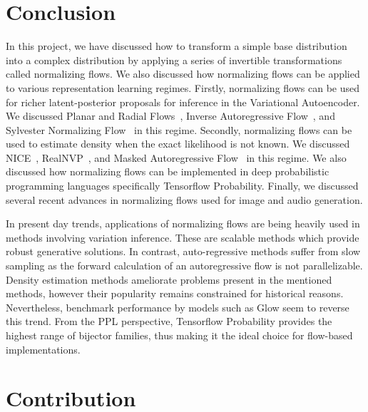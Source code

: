 \documentclass[runningheads]{llncs}
\begin{document}
\section{Conclusion}
In this project, we have discussed how to transform a simple base distribution into a complex distribution by applying a series of invertible transformations called normalizing flows. We also discussed how normalizing flows can be applied to various representation learning regimes. Firstly, normalizing flows can be used for richer latent-posterior proposals for inference in the Variational Autoencoder. We discussed Planar and Radial Flows~\cite{rezende2015variational}, Inverse Autoregressive Flow~\cite{kingma2016improved}, and Sylvester Normalizing Flow~\cite{van2018sylvester} in this regime.  Secondly, normalizing flows can be used to estimate density when the exact likelihood is not known. We discussed NICE~\cite{dinh2014nice}, RealNVP~\cite{dinh2016density}, and Masked Autoregressive Flow~\cite{papamakarios2017masked} in this regime. We also discussed how normalizing flows can be implemented in deep probabilistic programming languages specifically Tensorflow Probability. Finally, we discussed several recent advances in normalizing flows used for image and audio generation.

In present day trends, applications of normalizing flows are being heavily used in methods involving variation inference. These are scalable methods which provide robust generative solutions. In contrast, auto-regressive methods suffer from slow sampling as the forward calculation of an autoregressive flow is not parallelizable. Density estimation methods ameliorate problems present in the mentioned methods, however their popularity remains constrained for historical reasons. Nevertheless, benchmark performance by models such as Glow seem to reverse this trend. From the PPL perspective, Tensorflow Probability provides the highest range of bijector families, thus making it the ideal choice for flow-based implementations. 

%
%
%
% 
% 
%

 




\appendix


\section{Contribution}
\end{document}
